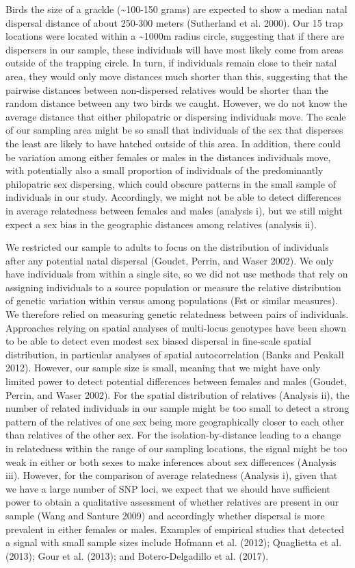 \documentclass[
]{article}
\begin{document}
Birds the size of a grackle (\textasciitilde100-150 grams) are expected
to show a median natal dispersal distance of about 250-300 meters
(Sutherland et al. 2000). Our 15 trap locations were located within a
\textasciitilde1000m radius circle, suggesting that if there are
dispersers in our sample, these individuals will have most likely come
from areas outside of the trapping circle. In turn, if individuals
remain close to their natal area, they would only move distances much
shorter than this, suggesting that the pairwise distances between
non-dispersed relatives would be shorter than the random distance
between any two birds we caught. However, we do not know the average
distance that either philopatric or dispersing individuals move. The
scale of our sampling area might be so small that individuals of the sex
that disperses the least are likely to have hatched outside of this
area. In addition, there could be variation among either females or
males in the distances individuals move, with potentially also a small
proportion of individuals of the predominantly philopatric sex
dispersing, which could obscure patterns in the small sample of
individuals in our study. Accordingly, we might not be able to detect
differences in average relatedness between females and males (analysis
i), but we still might expect a sex bias in the geographic distances
among relatives (analysis ii).

We restricted our sample to adults to focus on the distribution of
individuals after any potential natal dispersal (Goudet, Perrin, and
Waser 2002). We only have individuals from within a single site, so we
did not use methods that rely on assigning individuals to a source
population or measure the relative distribution of genetic variation
within versus among populations (Fst or similar measures). We therefore
relied on measuring genetic relatedness between pairs of individuals.
Approaches relying on spatial analyses of multi-locus genotypes have
been shown to be able to detect even modest sex biased dispersal in
fine-scale spatial distribution, in particular analyses of spatial
autocorrelation (Banks and Peakall 2012). However, our sample size is
small, meaning that we might have only limited power to detect potential
differences between females and males (Goudet, Perrin, and Waser 2002).
For the spatial distribution of relatives (Analysis ii), the number of
related individuals in our sample might be too small to detect a strong
pattern of the relatives of one sex being more geographically closer to
each other than relatives of the other sex. For the
isolation-by-distance leading to a change in relatedness within the
range of our sampling locations, the signal might be too weak in either
or both sexes to make inferences about sex differences (Analysis iii).
However, for the comparison of average relatedness (Analysis i), given
that we have a large number of SNP loci, we expect that we should have
sufficient power to obtain a qualitative assessment of whether relatives
are present in our sample (Wang and Santure 2009) and accordingly
whether dispersal is more prevalent in either females or males. Examples
of empirical studies that detected a signal with small sample sizes
include Hofmann et al. (2012); Quaglietta et al. (2013); Gour et al.
(2013); and Botero-Delgadillo et al. (2017).
\end{document}
